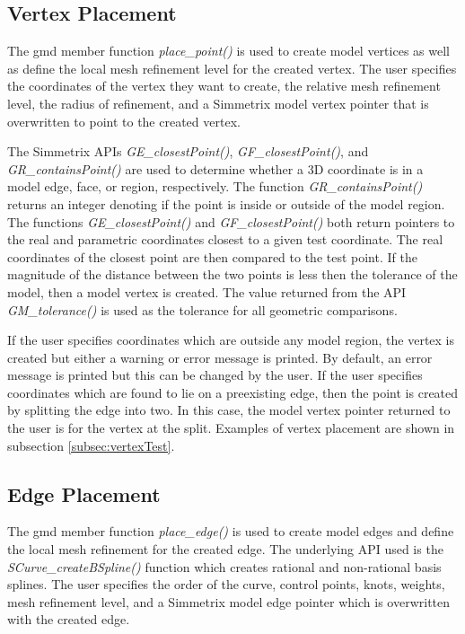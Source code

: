 \documentclass[a4paper, 12pt]{article}
\begin{document}
\subsection{Vertex Placement} \label{subsec:vertex}
The gmd member function \emph{place\_point()} is used to create model
vertices as well as define the local mesh refinement level
for the created vertex.
The user specifies the coordinates of the vertex they want to create, the 
relative mesh refinement level, the radius of refinement, and a Simmetrix
model vertex pointer that is overwritten to point to the created vertex. 

The Simmetrix APIs \emph{GE\_closestPoint()}, \emph{GF\_closestPoint()}, 
and \emph{GR\_containsPoint()} are used to determine whether 
a 3D coordinate is in a model edge, face, or region, respectively. 
The function \emph{GR\_containsPoint()}
returns an integer denoting if the point 
is inside or outside of the model region. 
The functions \emph{GE\_closestPoint()} 
and \emph{GF\_closestPoint()} both return 
pointers to the real and parametric coordinates closest
to a given test coordinate. 
The real coordinates of the closest point are 
then compared to the test point.
If the magnitude of the distance between the two points is less then the 
tolerance of the model, then a model vertex is created. 
The value returned from the API \emph{GM\_tolerance()} is used as the 
tolerance for all geometric comparisons. 

If the user specifies coordinates
which are outside any model region, the vertex is created but either a 
warning or error message is printed. By default, an error message is printed
but this can be changed by the user. If the user specifies coordinates 
which are found to lie on a preexisting edge, then the point is created
by splitting the edge into two. In this case, the model vertex pointer
returned to the user is for the vertex at the split.
Examples of vertex placement are shown in 
subsection \ref{subsec:vertexTest}.

\subsection{Edge Placement} \label{subsec:edge}
The gmd member function \emph{place\_edge()} is used
to create model edges and define the local mesh refinement 
for the created edge.  The underlying API used
is the \emph{SCurve\_createBSpline()} function which 
creates rational and non-rational
basis splines. The user specifies the order of the curve, 
control points, knots,
weights, mesh refinement level, and a Simmetrix model 
edge pointer which is 
overwritten with the created edge. 
\end{document}
